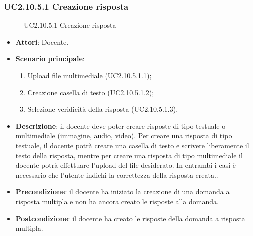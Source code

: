 \subsubsection{UC2.10.5.1 Creazione risposta}
\begin{figure}[H]
\centering
\noindent{}
\caption{UC2.10.5.1 Creazione risposta}
\end{figure}
\begin{itemize}
\item \textbf{Attori}: Docente.
\item \textbf{Scenario principale}:
\begin{enumerate}
\item Upload file multimediale (UC2.10.5.1.1);
\item Creazione casella di testo (UC2.10.5.1.2);
\item Selezione veridicità della risposta (UC2.10.5.1.3).
\end{enumerate}
\item \textbf{Descrizione}: il docente deve poter creare risposte di tipo testuale o multimediale (immagine, audio, video). Per creare una risposta di tipo testuale, il docente potrà creare una casella di testo e scrivere liberamente il testo della risposta, mentre per creare una risposta di tipo multimediale il docente potrà effettuare l'upload del file desiderato. In entrambi i casi è necessario che l'utente indichi la correttezza della risposta creata..
\item \textbf{Precondizione}: il docente ha iniziato la creazione di una domanda a risposta multipla e non ha ancora creato le risposte alla domanda.
\item \textbf{Postcondizione}: il docente ha creato le risposte della domanda a risposta multipla.
\end{itemize}
